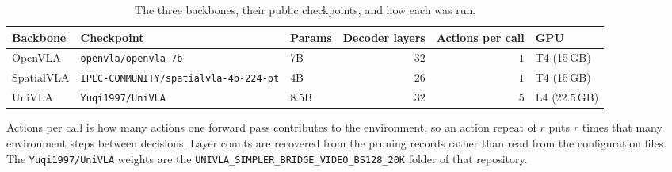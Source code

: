 %
%
%
%
%
\begin{table}[t]
\centering
\caption{The three backbones, their public checkpoints, and how each was run.}
\label{tab:backbones}
\setlength{\tabcolsep}{6pt}
\begin{tabular}{l l l r r l}
\toprule
Backbone & Checkpoint & Params & Decoder layers & Actions per call & GPU \\
\midrule
OpenVLA & \texttt{openvla/openvla-7b} & 7B & $32$ & $1$ & T4 (15\,GB) \\
SpatialVLA & \texttt{IPEC-COMMUNITY/spatialvla-4b-224-pt} & 4B & $26$ & $1$ & T4 (15\,GB) \\
UniVLA & \texttt{Yuqi1997/UniVLA} & 8.5B & $32$ & $5$ & L4 (22.5\,GB) \\
\bottomrule
\end{tabular}

\parbox{\textwidth}{\footnotesize Actions per call is how many actions one
forward pass contributes to the environment, so an action repeat of $r$ puts
$r$ times that many environment steps between decisions. Layer counts are
recovered from the pruning records rather than read from the configuration
files. The \texttt{Yuqi1997/UniVLA} weights are the \texttt{UNIVLA\_SIMPLER\_BRIDGE\_VIDEO\_BS128\_20K} folder of that repository.}
\end{table}
